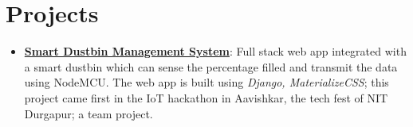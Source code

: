 \documentclass[a4paper,11pt]{article}
\begin{document}
\section{Projects}
      \setlength{\itemsep}{0.5pt}
      \begin{itemize}
        \item\textbf{\href{https://github.com/Workaholics-nitd/iot-hackathon}{Smart Dustbin Management System}}{: Full stack web app integrated with a smart dustbin which can sense the percentage filled and transmit the data using NodeMCU. The web app is built using \textit{Django, MaterializeCSS}; this project came first in the IoT hackathon in Aavishkar, the tech
        fest of NIT Durgapur; a team project.}
      \end{itemize}
  
\end{document}
